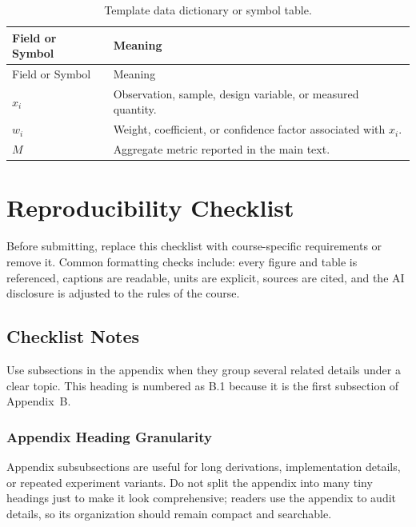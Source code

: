 \documentclass[a4paper,11pt]{report}
\begin{document}
\begin{longtable}{p{}p{}}
  \caption{Template data dictionary or symbol table.}
  \label{tab:data_dictionary}\\
  \toprule
  Field or Symbol & Meaning \\
  \midrule
  \endfirsthead
  \toprule
  Field or Symbol & Meaning \\
  \midrule
  \endhead
  \(x_i\) & Observation, sample, design variable, or measured quantity. \\
  \(w_i\) & Weight, coefficient, or confidence factor associated with \(x_i\). \\
  \(M\) & Aggregate metric reported in the main text. \\
  \bottomrule
\end{longtable}

\section{Reproducibility Checklist}

Before submitting, replace this checklist with course-specific requirements or remove it. Common formatting checks include: every figure and table is referenced, captions are readable, units are explicit, sources are cited, and the AI disclosure is adjusted to the rules of the course.

\subsection{Checklist Notes}

Use subsections in the appendix when they group several related details under a clear topic. This heading is numbered as B.1 because it is the first subsection of Appendix~B.

\subsubsection{Appendix Heading Granularity}

Appendix subsubsections are useful for long derivations, implementation details, or repeated experiment variants. Do not split the appendix into many tiny headings just to make it look comprehensive; readers use the appendix to audit details, so its organization should remain compact and searchable.
\end{document}

